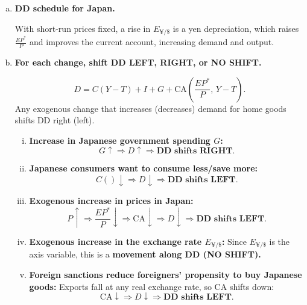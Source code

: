 \documentclass[11pt]{article}
\newcommand{\usd}{\text{\$}}
\newcommand{\CA}{\text{CA}}
\newcommand{\dd}{\text{DD}}
\newenvironment{problem}[2][Problem]{\begin{trivlist}
\item[\hskip \labelsep {\bfseries #1}\hskip \labelsep {\bfseries #2.}]
\leavevmode\par
}{\end{trivlist}}
\begin{document}
\begin{problem}{2}

\vspace{0.25em}
\begin{enumerate}[(a)]
\item \textbf{DD schedule for Japan.}

With short-run prices fixed, a rise in $E_{\yen/\usd}$ is a yen depreciation, which raises $\frac{EP^*}{P}$ and improves the current account,
increasing demand and output.

\begin{center}
\end{center}

\item \textbf{For each change, shift DD LEFT, RIGHT, or NO SHIFT.}

\[
D = C(Y-T) + I + G + \CA\!\left(\frac{EP^*}{P},\,Y-T\right).
\]
Any exogenous change that increases (decreases) demand for home goods shifts DD right (left).

\begin{enumerate}[(i)]
\item \textbf{Increase in Japanese government spending $G$:}
\[
G\uparrow \Rightarrow D\uparrow \Rightarrow \textbf{DD shifts RIGHT.}
\]

\item \textbf{Japanese consumers want to consume less/save more:}
\[
C()\downarrow \Rightarrow D\downarrow \Rightarrow \textbf{DD shifts LEFT.}
\]

\item \textbf{Exogenous increase in prices in Japan:}
\[
P\uparrow \Rightarrow \frac{EP^*}{P}\downarrow \Rightarrow \CA\downarrow \Rightarrow D\downarrow
\Rightarrow \textbf{DD shifts LEFT.}
\]

\item \textbf{Exogenous increase in the exchange rate $E_{\yen/\usd}$:}
Since $E_{\yen/\usd}$ is the axis variable, this is a \textbf{movement along DD (NO SHIFT).}

\item \textbf{Foreign sanctions reduce foreigners' propensity to buy Japanese goods:}
Exports fall at any real exchange rate, so $\CA$ shifts down:
\[
\CA\downarrow \Rightarrow D\downarrow \Rightarrow \textbf{DD shifts LEFT.}
\]
\end{enumerate}

\end{enumerate}
\end{problem}
\end{document}
